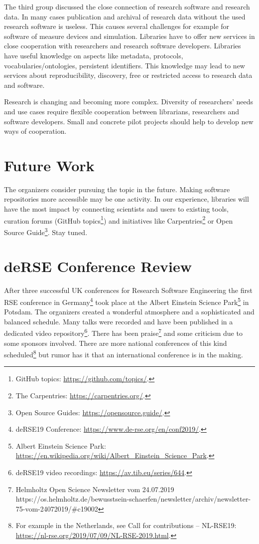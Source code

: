 \documentclass[a4paper,
fontsize=11pt,
oneside,
numbers=noperiodatend,
parskip=half-,
bibliography=totoc,
final
]{scrartcl}
\begin{document}
The third group discussed the close connection of research software and
research data. In many cases publication and archival of research data
without the used research software is useless. This causes several
challenges for example for software of measure devices and simulation.
Libraries have to offer new services in close cooperation with
researchers and research software developers. Libraries have useful
knowledge on aspects like metadata, protocols, vocabularies/ontologies,
persistent identifiers. This knowledge may lead to new services about
reproducibility, discovery, free or restricted access to research data
and software.

Research is changing and becoming more complex. Diversity of
researchers' needs and use cases require flexible cooperation between
librarians, researchers and software developers. Small and concrete
pilot projects should help to develop new ways of cooperation.

\hypertarget{future-work}{%
\section{Future Work}\label{future-work}}

The organizers consider pursuing the topic in the future. Making
software repositories more accessible may be one activity. In our
experience, libraries will have the most impact by connecting scientists
and users to existing tools, curation forums (GitHub topics\footnote{GitHub
  topics: \url{https://github.com/topics/}.}) and initiatives like
Carpentries\footnote{The Carpentries: \url{https://carpentries.org/}.}
or Open Source Guide\footnote{Open Source Guides:
  \url{https://opensource.guide/}.}. Stay tuned.

\hypertarget{derse-conference-review}{%
\section*{deRSE Conference Review}\label{derse-conference-review}}

After three successful UK conferences for Research Software Engineering
the first RSE conference in Germany\footnote{deRSE19 Conference:
  \url{https://www.de-rse.org/en/conf2019/}.} took place at the Albert
Einstein Science Park\footnote{Albert Einstein Science Park:
  \url{https://en.wikipedia.org/wiki/Albert_Einstein_Science_Park}.} in
Potsdam. The organizers created a wonderful atmosphere and a
sophisticated and balanced schedule. Many talks were recorded and have
been published in a dedicated video repository\footnote{deRSE19 video
  recordings: \url{https://av.tib.eu/series/644}.}. There has been
praise\footnote{Helmholtz Open Science Newsletter vom 24.07.2019
  https://os.helmholtz.de/bewusstsein-schaerfen/newsletter/archiv/newsletter-75-vom-24072019/\#c19002}
and some criticism due to some sponsors involved. There are more
national conferences of this kind scheduled\footnote{For example in the
  Netherlands, see Call for contributions -- NL-RSE19:
  \url{https://nl-rse.org/2019/07/09/NL-RSE-2019.html}.} but rumor has
it that an international conference is in the making.
\end{document}
